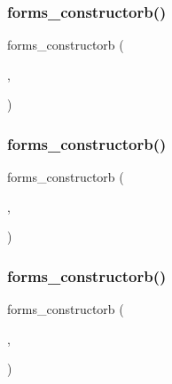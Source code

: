\mbox{\label{forms_8_h_ad7e34ab40eaf16ae2fd683fe5fa51746}} 
\subsubsection{\texorpdfstring{forms\+\_\+constructorb()}{forms\_constructorb()}\hspace{0.1cm}{\footnotesize\ttfamily [2/4]}}
{\footnotesize\ttfamily forms\+\_\+constructorb (\begin{DoxyParamCaption}\item[{\hyperlink{class_fl___forms_pixmap}{Fl\+\_\+\+Forms\+Pixmap}}]{,  }\item[{fl\+\_\+add\+\_\+pixmap}]{ }\end{DoxyParamCaption})}

\mbox{\label{forms_8_h_af620a3edc970290767b1756cd83e68a3}} 
\subsubsection{\texorpdfstring{forms\+\_\+constructorb()}{forms\_constructorb()}\hspace{0.1cm}{\footnotesize\ttfamily [3/4]}}
{\footnotesize\ttfamily forms\+\_\+constructorb (\begin{DoxyParamCaption}\item[{\hyperlink{class_fl___box}{Fl\+\_\+\+Box}}]{,  }\item[{fl\+\_\+add\+\_\+box}]{ }\end{DoxyParamCaption})}

\mbox{\label{forms_8_h_a40723bee8eca1aed53b00312fa48d7b9}} 
\subsubsection{\texorpdfstring{forms\+\_\+constructorb()}{forms\_constructorb()}\hspace{0.1cm}{\footnotesize\ttfamily [4/4]}}
{\footnotesize\ttfamily forms\+\_\+constructorb (\begin{DoxyParamCaption}\item[{\hyperlink{class_fl___forms_text}{Fl\+\_\+\+Forms\+Text}}]{,  }\item[{fl\+\_\+add\+\_\+text}]{ }\end{DoxyParamCaption})}


